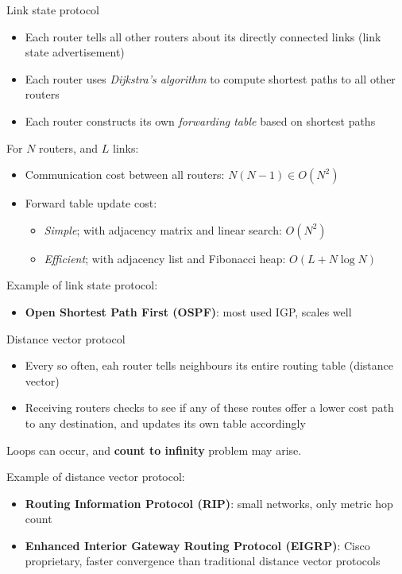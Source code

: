 \begin{definition}
    {Link state protocol}

    \begin{itemize}
        \item Each router tells all other routers about its directly connected links (link state advertisement)
        \item Each router uses \textit{Dijkstra's algorithm} to compute shortest paths to all other routers
        \item Each router constructs its own \textit{forwarding table} based on shortest paths
    \end{itemize}

    For $N$ routers, and $L$ links:
    \begin{itemize}
        \item Communication cost between all routers: $N(N-1) \in O(N^2)$
        \item Forward table update cost:
              \begin{itemize}
                  \item \textit{Simple}; with adjacency matrix and linear search: $O(N^2)$
                  \item \textit{Efficient}; with adjacency list and Fibonacci heap: $O(L + N\log N)$
              \end{itemize}
    \end{itemize}

    \tcblower

    Example of link state protocol:
    \begin{itemize}
        \item \textbf{Open Shortest Path First (OSPF)}: most used IGP, scales well
    \end{itemize}
\end{definition}


\begin{definition}
    {Distance vector protocol}

    \begin{itemize}
        \item Every so often, eah router tells neighbours its entire routing table (distance vector)
        \item Receiving routers checks to see if any of these routes offer a lower cost path to any destination, and updates its own table accordingly
    \end{itemize}

    Loops can occur, and \textbf{count to infinity} problem may arise.

    \tcblower

    Example of distance vector protocol:
    \begin{itemize}
        \item \textbf{Routing Information Protocol (RIP)}: small networks, only metric hop count
        \item \textbf{Enhanced Interior Gateway Routing Protocol (EIGRP)}: Cisco proprietary, faster convergence than traditional distance vector protocols
    \end{itemize}
\end{definition}

